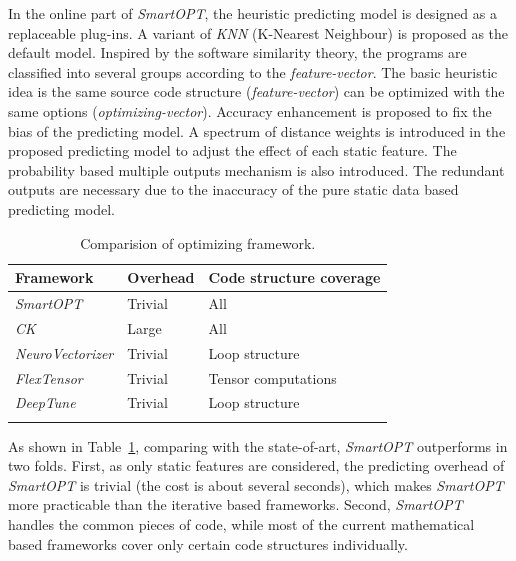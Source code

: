 \documentclass[bst/sn-mathphys]{sn-jnl}%
\theoremstyle{thmstyleone}%
\theoremstyle{thmstyletwo}%
\theoremstyle{thmstylethree}%
\begin{document}
In the online part of \emph{SmartOPT}, the heuristic predicting model is 
designed as a 
replaceable plug-ins. A variant of \emph{KNN} (K-Nearest Neighbour) 
is proposed as the default model. Inspired by the software similarity theory,
the programs are classified into several groups according to the 
\emph{feature-vector}.
The basic heuristic idea is the same source code structure 
(\emph{feature-vector}) can be optimized with the same options 
(\emph{optimizing-vector}). Accuracy 
enhancement is proposed to fix the bias of the predicting model. A spectrum of 
distance weights is introduced in the proposed predicting model to adjust the 
effect of each static feature. The probability based multiple outputs 
mechanism is also introduced. The redundant outputs are necessary due to the 
inaccuracy of the pure static data based predicting model. 

\begin{table}[h]
\begin{center}
\begin{minipage}{\textwidth}
\caption{Comparision of optimizing framework.}\label{TAB1}%
\begin{tabular}{@{}lll@{}}
\toprule
Framework 			& Overhead	& Code structure coverage\\
\midrule
\emph{SmartOPT}    		& Trivial   	& All			\\
\emph{CK}\cite{fursin2021collective}    		& Large		& All	  		\\
\emph{NeuroVectorizer}\cite{haj2020neurovectorizer}	& Trivial	& Loop structure  \\
\emph{FlexTensor}\cite{zheng2020flextensor}	& Trivial	& Tensor computations \\
\emph{DeepTune}\cite{cummins2017end}		& Trivial	& Loop structure \\
\botrule
\end{tabular}
\end{minipage}
\end{center}
\end{table}

As shown in Table~\ref{TAB1}, comparing with the state-of-art, \emph{SmartOPT}
outperforms in two folds. First, as only static features are considered, 
the predicting overhead of \emph{SmartOPT} is trivial (the cost is about 
several seconds), which makes \emph{SmartOPT} more practicable 
than the iterative based frameworks. Second, \emph{SmartOPT} handles the 
common pieces of code, while most of the current mathematical based frameworks 
cover only certain code structures individually. 
\end{document}
